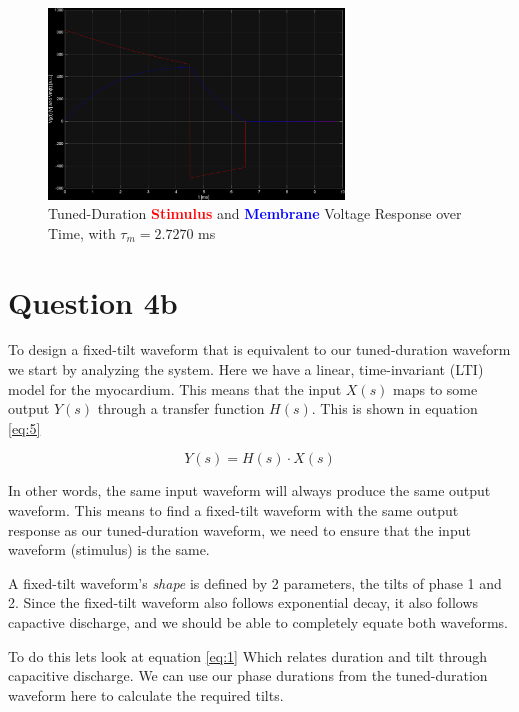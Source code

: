 \documentclass[]{report}
\begin{document}
\begin{figure}[H]
	\centering
	\includegraphics[width=0.7\textwidth]{q4_response.png}
	\caption{\centering Tuned-Duration \textcolor{red}{\textbf{Stimulus}} and \textcolor{blue}{\textbf{Membrane}} Voltage Response over Time, with $\tau_m = 2.7270$ ms}
	\label{fig:7}
\end{figure}

\section*{Question 4b}

To design a fixed-tilt waveform that is equivalent to our tuned-duration waveform we start by analyzing the system. Here we have a linear, time-invariant (LTI) model for the myocardium. This means that the input $X(s)$ maps to some output $Y(s)$ through a transfer function $H(s)$. This is shown in equation \ref{eq:5}

\begin{equation}
\label{eq:5}
Y(s) = H(s) \cdot X(s)
\end{equation}

In other words, the same input waveform will always produce the same output waveform. This means to find a fixed-tilt waveform with the same output response as our tuned-duration waveform, we need to ensure that the input waveform (stimulus) is the same.

A fixed-tilt waveform's \textit{shape} is defined by 2 parameters, the tilts of phase 1 and 2. Since the fixed-tilt waveform also follows exponential decay, it also follows capactive discharge, and we should be able to completely equate both waveforms.

To do this lets look at equation \ref{eq:1} Which relates duration and tilt through capacitive discharge. We can use our phase durations from the tuned-duration waveform here to calculate the required tilts.
\end{document}
